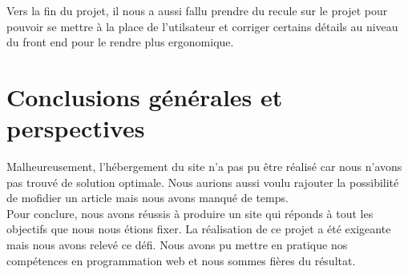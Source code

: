 \documentclass[12pt,a4paper]{report}
\begin{document}
Vers la fin du projet, il nous a aussi fallu prendre du recule sur le projet pour pouvoir se mettre à la place de l'utilsateur et corriger certains détails au niveau du front end pour le rendre plus ergonomique. 

\section{Conclusions générales et perspectives}
Malheureusement, l'hébergement du site n'a pas pu être réalisé car nous n'avons pas trouvé de solution optimale. Nous aurions aussi voulu rajouter la possibilité de mofidier un article mais nous avons manqué de temps. \\

Pour conclure, nous avons réussis à produire un site qui réponds à tout les objectifs que nous nous étions fixer. La réalisation de ce projet a été exigeante mais nous avons relevé ce défi. Nous avons pu mettre en pratique nos compétences en programmation web et nous sommes fières du résultat. 
\end{document}
